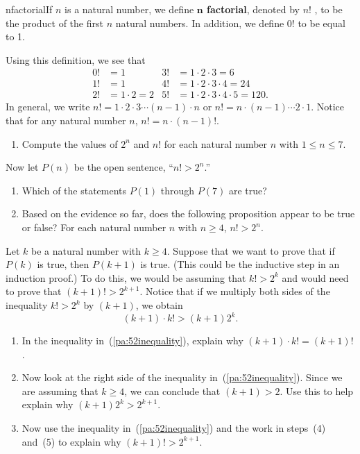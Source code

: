 \begin{previewactivity} \label{PA:factorials} \hfill

\begin{defbox}{nfactorial}{If  $n$  is a natural number, we define \textbf{$\boldsymbol{n}$  factorial},
%
 denoted by $n!$ \label{sym:factorial},  to be the product of the first  $n$  natural numbers.  In addition, we define  $0!$ to be equal to  1.}
\end{defbox} 
Using this definition, we see that
\begin{align*}
0! &= 1  &  3! &= 1 \cdot 2 \cdot 3 = 6 \\
1! &=1   &  4! &= 1 \cdot 2 \cdot 3 \cdot 4 = 24\\
2! &= 1 \cdot 2 = 2  &  5! &= 1 \cdot 2 \cdot 3 \cdot 4 \cdot 5 = 120.
\end{align*}
%
\noindent
In general, we write  $n! = 1 \cdot 2 \cdot 3   \cdots \left( {n - 1} \right) \cdot n$ or  $n! = n \cdot \left( {n - 1} \right)  \cdots 2 \cdot 1$.  Notice that  for any natural number $n$, $n! = n \cdot (n-1)!$.
%
\begin{enumerate}
\item Compute the values of $2^n$ and $n!$ for each natural number  $n$  with  $1 \leq n \leq 7$. 
\label{pa:5211}
\end{enumerate}
Now let $P(n)$ be the open sentence, ``$n! > 2^n$.''
\setcounter{oldenumi}{\theenumi}
\begin{enumerate} \setcounter{enumi}{\theoldenumi}
  \item Which of the statements $P(1)$ through $P(7)$ are true?
\item Based on the evidence so far, does the following proposition appear to be true or false? \label{pa:5212}
For each natural number  $n$ with $n \geq 4$,
$n! > 2^n $.
\end{enumerate}
\setcounter{equation}{0}
Let $k$ be a natural number with $k \geq 4$.  Suppose that we want to prove that if $P(k)$ is true, then $P(k+1)$ is true.  (This could be the inductive step in an induction proof.)  To do this, we would be assuming that $k! > 2^k$ and would need to prove that $(k+1)! > 2^{k+1}$.  Notice that if we multiply both sides of the inequality $k! > 2^k$ by $(k + 1)$, we obtain
\begin{equation} \label{pa:52inequality}
(k + 1)\cdot k! > (k + 1) 2^k. 
\end{equation}
\setcounter{oldenumi}{\theenumi}
\begin{enumerate} \setcounter{enumi}{\theoldenumi}
\item In the inequality in~(\ref{pa:52inequality}), explain why $(k + 1) \cdot k! = (k + 1)!$.
\item Now look at the right side of the inequality in~(\ref{pa:52inequality}).  Since we are assuming that $k \geq 4$, we can conclude that $(k+1) > 2$.  Use this to help explain why $(k + 1)2^k > 2^{k+1}$.
\item Now use the inequality in~(\ref{pa:52inequality}) and the work in steps~(4) and~(5) to explain why 
$(k+1)! > 2^{k+1}$.
\end{enumerate}


\end{previewactivity}
